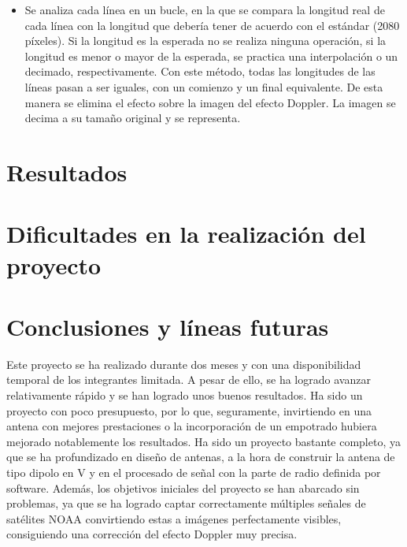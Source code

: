 \documentclass[a4paper,openright,12pt]{article}
\begin{document}
\begin{itemize}
\begin{itemize}
	\item Se analiza cada línea en un bucle, en la que se compara la longitud real de cada línea con la longitud que debería tener de acuerdo con el estándar (2080 píxeles). Si la longitud es la esperada no se realiza ninguna operación, si la longitud es menor o mayor de la esperada, se practica una interpolación o un decimado, respectivamente. Con este método, todas las longitudes de las líneas pasan a ser iguales, con un comienzo y un final equivalente. De esta manera se elimina el efecto sobre la imagen del efecto Doppler. La imagen se decima a su tamaño original y se representa.
	




\end{itemize}
	

	
	
	\end{itemize}

\section{Resultados}

\section{Dificultades en la realización del proyecto}

\newpage
\section{Conclusiones y líneas futuras}

Este proyecto se ha realizado durante dos meses y con una disponibilidad temporal de los integrantes limitada. A pesar de ello, se ha logrado avanzar relativamente rápido y se han logrado unos buenos resultados. Ha sido un proyecto con poco presupuesto, por lo que, seguramente, invirtiendo en una antena con mejores prestaciones o la incorporación de un empotrado hubiera mejorado notablemente los resultados.
Ha sido un proyecto bastante completo, ya que se ha profundizado en diseño de antenas, a la hora de construir la antena de tipo dipolo en V y en el procesado de señal con la parte de radio definida por software. Además, los objetivos iniciales del proyecto se han abarcado sin problemas, ya que se ha logrado captar correctamente múltiples señales de satélites NOAA convirtiendo estas a imágenes perfectamente visibles, consiguiendo una corrección del efecto Doppler muy precisa.
\end{document}
